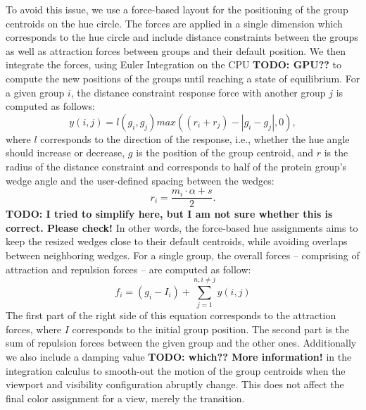 \documentclass{egpubl}
\begin{document}
	To avoid this issue, we use a force-based layout for the positioning of the group centroids on the hue circle.
	The forces are applied in a single dimension which corresponds to the hue circle and include distance constraints between the groups as well as attraction forces between groups and their default position.
	We then integrate the forces, using Euler Integration on the CPU \textbf{TODO: GPU??} to compute the new positions of the groups until reaching a state of equilibrium.
	For a given group $i$, the distance constraint response force with another group $j$ is computed as follows:
	\begin{equation}%
	y(i, j) = l(g_{i},g_{j})max((r_{i}+r_{j}) - |g_{i} - g_{j}|, 0), 
	\end{equation}%
	where $l$ corresponds to the direction of the response, i.e., whether the hue angle should increase or decrease, $g$ is the position of the group centroid, and $r$ is the radius of the distance constraint and corresponds to half of the protein group's wedge angle and the user-defined spacing between the wedges:  
	\begin{equation}
	r_i = \frac{m_i \cdot \alpha + s}{2}. 
	\end{equation}
	\textbf{TODO: I tried to simplify here, but I am not sure whether this is correct. Please check!} 
	In other words, the force-based hue assignments aims to keep the resized wedges close to their default centroids, while avoiding overlaps between neighboring wedges.  
	For a single group, the overall forces -- comprising of attraction and repulsion forces -- are computed as follow:
	\begin{equation}
	f_{i} = (g_{i} - I_{i}) + \sum_{j=1}^{n, i \neq j} y(i,j)
	\end{equation}
	The first part of the right side of this equation corresponds to the attraction forces, where $I$ corresponds to the initial group position.
	The second part is the sum of repulsion forces between the given group and the other ones.
    Additionally we also include a damping value \textbf{TODO: which?? More information!} in the integration calculus to smooth-out the motion of the group centroids when the viewport and visibility configuration abruptly change. This does not affect the final color assignment for a view, merely the transition.
	
\end{document}
